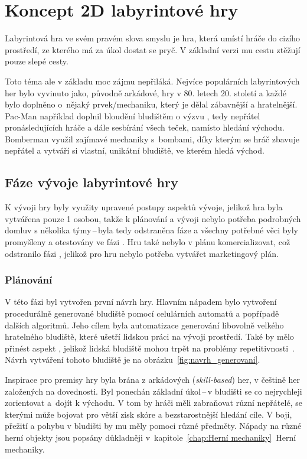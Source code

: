 \chapter{Koncept 2D labyrintové hry}
Labyrintová hra ve svém pravém slova smyslu je hra, která umístí hráče do cizího prostředí, ze kterého má za úkol dostat se pryč. V základní verzi mu cestu ztěžují pouze slepé cesty. 

Toto téma ale v základu moc zájmu nepřiláká. Nejvíce populárních labyrintových her bylo vyvinuto jako, původně arkádové, hry v 80. letech 20. století a každé bylo doplněno o~nějaký prvek/mechaniku, který je dělal zábavnější a hratelnější. Pac-Man například doplnil bloudění bludištěm o výzvu , tedy nepřátel pronásledujících hráče a dále sesbírání všech teček, namísto hledání východu. Bomberman využil zajímavé mechaniky s~bombami, díky kterým se hráč zbavuje nepřátel a vytváří si vlastní, unikátní bludiště, ve kterém hledá východ.

\section{Fáze vývoje labyrintové hry}
K vývoji hry byly využity upravené postupy aspektů vývoje, jelikož hra byla vytvářena pouze 1 osobou, takže k plánování a vývoji nebylo potřeba podrobných domluv s několika týmy\,--\,byla tedy odstraněna fáze  a všechny potřebné věci byly promyšleny a otestovány ve fázi . Hru také nebylo v plánu komercializovat, což odstranilo fázi , jelikož pro hru nebylo potřeba vytvářet marketingový plán.

\subsection*{Plánování}
V této fázi byl vytvořen první návrh hry. Hlavním nápadem bylo vytvoření procedurálně generované bludiště pomocí celulárních automatů a popřípadě dalších algoritmů. Jeho cílem byla automatizace generování libovolně velkého hratelného bludiště, které ušetří lidskou práci na vývoji prostředí. Také by mělo přinést aspekt , jelikož lidská bludiště mohou trpět na problémy repetitivnosti~\cite{Procedural_Game_Map}. Návrh vytváření tohoto bludiště je na obrázku~\ref{fig:navrh_generovani}.

Inspirace pro premisy hry byla brána z arkádových (\textit{skill-based}) her, v češtině her založených na dovednosti. Byl ponechán základní úkol\,--\,v bludišti se co nejrychleji zorientovat a~dojít k východu. V tom by hráči měli zabraňovat různí nepřátelé, se kterými může bojovat pro větší zisk skóre a bezstarostnější hledání cíle. V boji, přežití a pohybu v bludišti  by mu měly pomoci různé předměty. Nápady na různé herní objekty jsou popsány důkladněji v~kapitole~\ref{chap:Herní mechaniky}~Herní mechaniky.

